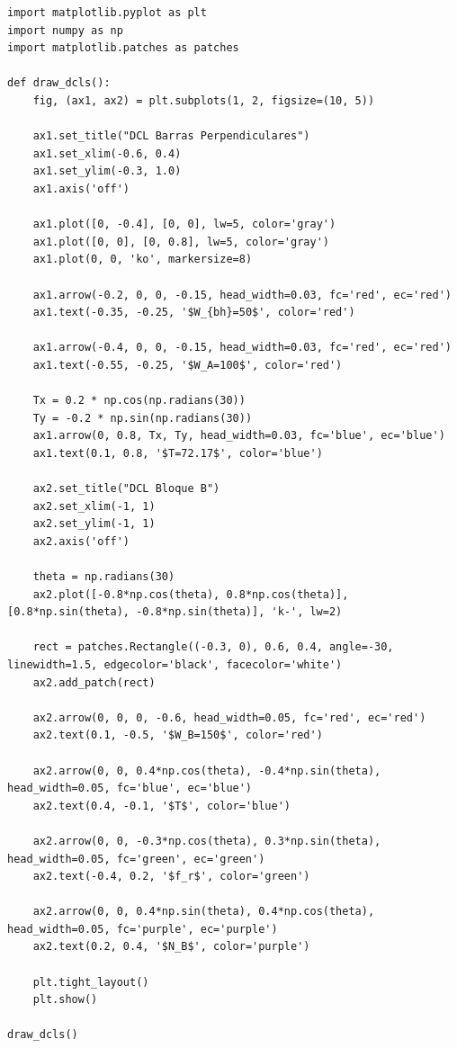 \documentclass[12pt, a4paper]{article}
\begin{document}
\begin{lstlisting}
import matplotlib.pyplot as plt
import numpy as np
import matplotlib.patches as patches

def draw_dcls():
    fig, (ax1, ax2) = plt.subplots(1, 2, figsize=(10, 5))
    
    ax1.set_title("DCL Barras Perpendiculares")
    ax1.set_xlim(-0.6, 0.4)
    ax1.set_ylim(-0.3, 1.0)
    ax1.axis('off')
    
    ax1.plot([0, -0.4], [0, 0], lw=5, color='gray')
    ax1.plot([0, 0], [0, 0.8], lw=5, color='gray')
    ax1.plot(0, 0, 'ko', markersize=8)
    
    ax1.arrow(-0.2, 0, 0, -0.15, head_width=0.03, fc='red', ec='red')
    ax1.text(-0.35, -0.25, '$W_{bh}=50$', color='red')
    
    ax1.arrow(-0.4, 0, 0, -0.15, head_width=0.03, fc='red', ec='red')
    ax1.text(-0.55, -0.25, '$W_A=100$', color='red')
    
    Tx = 0.2 * np.cos(np.radians(30))
    Ty = -0.2 * np.sin(np.radians(30))
    ax1.arrow(0, 0.8, Tx, Ty, head_width=0.03, fc='blue', ec='blue')
    ax1.text(0.1, 0.8, '$T=72.17$', color='blue')
    
    ax2.set_title("DCL Bloque B")
    ax2.set_xlim(-1, 1)
    ax2.set_ylim(-1, 1)
    ax2.axis('off')
    
    theta = np.radians(30)
    ax2.plot([-0.8*np.cos(theta), 0.8*np.cos(theta)], [0.8*np.sin(theta), -0.8*np.sin(theta)], 'k-', lw=2)
    
    rect = patches.Rectangle((-0.3, 0), 0.6, 0.4, angle=-30, linewidth=1.5, edgecolor='black', facecolor='white')
    ax2.add_patch(rect)
    
    ax2.arrow(0, 0, 0, -0.6, head_width=0.05, fc='red', ec='red')
    ax2.text(0.1, -0.5, '$W_B=150$', color='red')
    
    ax2.arrow(0, 0, 0.4*np.cos(theta), -0.4*np.sin(theta), head_width=0.05, fc='blue', ec='blue')
    ax2.text(0.4, -0.1, '$T$', color='blue')
    
    ax2.arrow(0, 0, -0.3*np.cos(theta), 0.3*np.sin(theta), head_width=0.05, fc='green', ec='green')
    ax2.text(-0.4, 0.2, '$f_r$', color='green')
    
    ax2.arrow(0, 0, 0.4*np.sin(theta), 0.4*np.cos(theta), head_width=0.05, fc='purple', ec='purple')
    ax2.text(0.2, 0.4, '$N_B$', color='purple')
    
    plt.tight_layout()
    plt.show()

draw_dcls()
\end{lstlisting}
\end{document}

